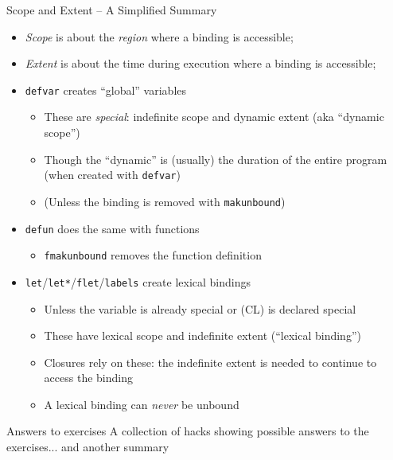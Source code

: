 \documentclass[presentation]{beamer}
\begin{document}
\begin{frame}{Scope and Extent -- A Simplified Summary}
  \begin{itemize}
  \item \emph{Scope} is about the \emph{region} where a binding is accessible;
  \item \emph{Extent} is about the time during execution where a binding is accessible;
  \item \texttt{defvar} creates ``global'' variables
    \begin{itemize}
    \item These are \emph{special}: indefinite scope and dynamic extent (aka ``dynamic scope'')
    \item Though the ``dynamic'' is (usually) the duration of the entire program (when created with \texttt{defvar})
    \item (Unless the binding is removed with \texttt{makunbound})
    \end{itemize}
  \item \texttt{defun} does the same with functions
    \begin{itemize}
    \item \texttt{fmakunbound} removes the function definition
    \end{itemize}
  \item \texttt{let}/\texttt{let*}/\texttt{flet}/\texttt{labels}  create lexical bindings
    \begin{itemize}
    \item Unless the variable is already special or (CL) is declared special
    \item These have lexical scope and indefinite extent (``lexical binding'')
    \item Closures rely on these: the indefinite extent is needed to continue to access the binding
    \item A lexical binding can \emph{never} be unbound
    \end{itemize}
  \end{itemize}
\end{frame}

\begin{frame}[fragile]{Answers to exercises}
A collection of hacks showing possible answers to the exercises... and another summary
\end{frame}
\end{document}
